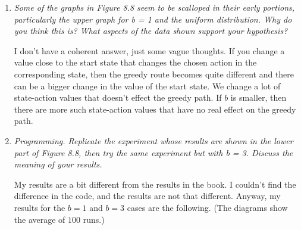 \documentclass[12pt,a4paper]{article}
\begin{document}
\begin{enumerate}
  \item 
    \textit{Some of the graphs in Figure 8.8 seem to be scalloped in their early portions,
    particularly the upper graph for b = 1 and the uniform distribution. Why do you think
    this is? What aspects of the data shown support your hypothesis?}

    I don't have a coherent answer, just some vague thoughts. If you change a value close to
    the start state that changes the chosen action in the corresponding state, then the greedy
    route becomes quite different and there can be a bigger change in the value of the start
    state. We change a lot of state-action values that doesn't effect the greedy path. If $b$
    is smaller, then there are more such state-action values that have no real effect on the
    greedy path.

  \item
    \textit{Programming. Replicate the experiment whose results are shown in the
    lower part of Figure 8.8, then try the same experiment but with b = 3. Discuss the
    meaning of your results.}

    My results are a bit different from the results in the book. I couldn't find the difference in the code,
    and the results are not that different. Anyway, my results for the $b = 1$ and $b = 3$
    cases are the following. (The diagrams show the average of $100$ runs.)


\end{enumerate}
\end{document}
